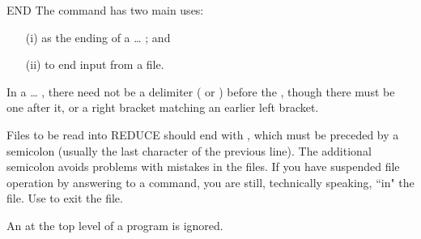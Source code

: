 \begin{Command}{END}
The command  has two main uses:
\begin{itemize}
\item[(i)]
as the ending of a \ldots{} ; and
\item[(ii)]
to end input from a file.
\end{itemize}

\begin{Comments}
In a \ldots{} , there need not be a delimiter
(\name{;} or \name{\$}) before the , though there must be one
after it, or a right bracket matching an earlier left bracket.

Files to be read into REDUCE should end with , which must be
preceded by a semicolon (usually the last character of the previous line).
The additional semicolon avoids problems with mistakes in the files.  If
you have suspended file operation by answering  to a 
command, you are still, technically speaking, ``in" the file.  Use
 to exit the file.

An  at the top level of a program is ignored.
\end{Comments}
\end{Command}


